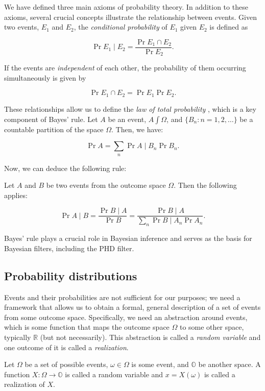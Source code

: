 We have defined three main axioms of probability theory. In addition to these axioms, several
crucial concepts illustrate the relationship between events. Given two events, $E_1$ and $E_2$,
the \textit{conditional probability} of $E_1$ given $E_2$ is defined as

$$
\Pr{E_1 \mid E_2} = \frac{\Pr{E_1 \cap E_2}}{\Pr{E_2}}.
$$

If the events are \textit{independent} of each other, the probability of them occurring
simultaneously is given by

$$
\Pr{E_1 \cap E_2} = \Pr{E_1}\Pr{E_2}.
$$

These relationships allow us to define the \textit{law of total probability} \cite[31]{zwillingerCRCStandardProbability2000}, which is a key component of Bayes' rule.
Let $A$ be an event, $A \int \Omega$, and $\{B_n : n = 1, 2, \ldots\}$ be a countable
partition of the space $\Omega$. Then, we have:

$$
\Pr{A} = \sum_n \Pr{A \mid B_n} \Pr{B_n}.
$$

Now, we can deduce the following rule:

\begin{definition}
Let $A$ and $B$ be two events from the outcome space $\Omega$. Then the following applies:

$$
\Pr{A \mid B} = \frac{\Pr{B \mid A}}{\Pr{B}}
    = \frac{\Pr{B \mid A}}{\sum_n \Pr{B \mid A_n}\Pr{A_n}}.
$$
\end{definition}

Bayes' rule plays a crucial role in Bayesian inference and serves as the basis for
Bayesian filters, including the PHD filter.

\subsection{Probability distributions}

Events and their probabilities are not sufficient for our purposes;
we need a framework that allows us to obtain a formal, general description of a set
of events from some outcome space. Specifically, we need an abstraction around events,
which is some function that maps the outcome space $\Omega$ to some other space,
typically $\mathbb{R}$ (but not necessarily). This abstraction is called a
\textit{random variable} and one outcome of it is called a \textit{realization}.

\begin{definition}
    Let $\Omega$ be a set of possible events, $\omega \in \Omega$ is some event,
    and $\mathbb{O}$ be another space. A function $X: \Omega \rightarrow \mathbb{O}$
    is called a random variable and $x = X(\omega)$ is called a realization of $X$.
\end{definition}

